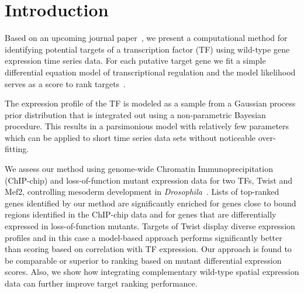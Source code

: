 \documentclass[accepted]{article}
\begin{document}



\section{Introduction}

Based on an upcoming journal paper~\citep{Honkela2010PNAS}, we present
a computational method for identifying potential targets of a
transcription factor (TF) using wild-type gene expression time series
data. For each putative target gene we fit a simple differential
equation model of transcriptional regulation and the model likelihood
serves as a score to rank targets~\citep{Gao2008}.

The expression profile of the TF is modeled as a sample from a
Gaussian process prior distribution that is integrated out using a
non-parametric Bayesian procedure. This results in a parsimonious
model with relatively few parameters which can be applied to short
time series data sets without noticeable over-fitting.

We assess our method using genome-wide Chromatin Immunoprecipitation
(ChIP-chip) and loss-of-function mutant expression data for two TFs,
Twist and Mef2, controlling mesoderm development in {\it
  Drosophila}~\citep{Zinzen2009}. Lists of top-ranked genes identified
by our method are significantly enriched for genes close to bound
regions identified in the ChIP-chip data and for genes that are
differentially expressed in loss-of-function mutants. Targets of Twist
display diverse expression profiles and in this case a model-based
approach performs significantly better than scoring based on
correlation with TF expression. Our approach is found to be comparable
or superior to ranking based on mutant differential expression
scores. Also, we show how integrating complementary wild-type spatial
expression data can further improve target ranking performance.
\end{document}
